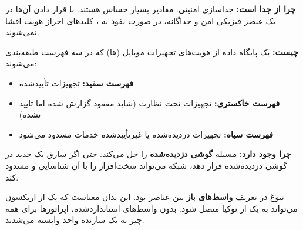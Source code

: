 \textbf{چرا از  جدا است:} جداسازی امنیتی. مقادیر  بسیار حساس هستند. با قرار دادن آن‌ها در یک عنصر فیزیکی امن و جداگانه، در صورت نفوذ به ، کلیدهای احراز هویت افشا نمی‌شوند.


\textbf{چیست:} یک پایگاه داده از هویت‌های تجهیزات موبایل (ها) که در سه فهرست طبقه‌بندی می‌شوند:

\begin{itemize}
\tightlist
\item
  \textbf{فهرست سفید:} تجهیزات تأییدشده
\item
  \textbf{فهرست خاکستری:} تجهیزات تحت نظارت (شاید مفقود گزارش شده اما تأیید نشده)
\item
  \textbf{فهرست سیاه:} تجهیزات دزدیده‌شده یا غیرتأییدشده  خدمات مسدود می‌شود
\end{itemize}

\textbf{چرا وجود دارد:}  مسیله \textbf{گوشی دزدیده‌شده} را حل می‌کند. حتی اگر سارق یک  جدید در گوشی دزدیده‌شده قرار دهد، شبکه می‌تواند سخت‌افزار را با  آن شناسایی و مسدود کند.



\CNchained{}

نبوغ  در تعریف \textbf{واسط‌های باز} بین عناصر بود. این بدان معناست که یک  از اریکسون می‌تواند به یک  از نوکیا متصل شود. بدون واسط‌های استانداردشده، اپراتورها برای همه چیز به یک سازنده واحد وابسته می‌شدند.



